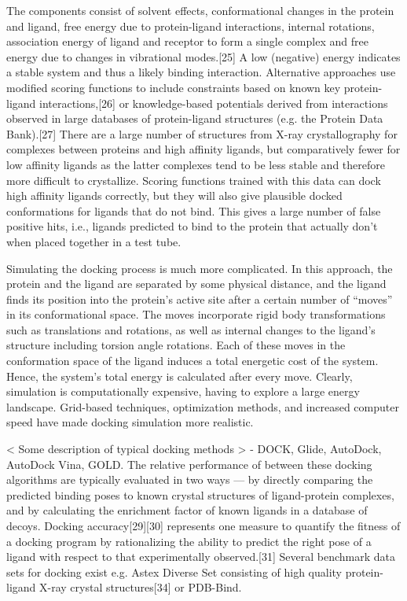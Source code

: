 The components consist of solvent effects, conformational changes in the protein and ligand, free energy due to protein-ligand interactions, internal rotations, association energy of ligand and receptor to form a single complex and free energy due to changes in vibrational modes.[25] A low (negative) energy indicates a stable system and thus a likely binding interaction. Alternative approaches use modified scoring functions to include constraints based on known key protein-ligand interactions,[26] or knowledge-based potentials derived from interactions observed in large databases of protein-ligand structures (e.g. the Protein Data Bank).[27] There are a large number of structures from X-ray crystallography for complexes between proteins and high affinity ligands, but comparatively fewer for low affinity ligands as the latter complexes tend to be less stable and therefore more difficult to crystallize. Scoring functions trained with this data can dock high affinity ligands correctly, but they will also give plausible docked conformations for ligands that do not bind. This gives a large number of false positive hits, i.e., ligands predicted to bind to the protein that actually don't when placed together in a test tube.

Simulating the docking process is much more complicated. In this approach, the protein and the ligand are separated by some physical distance, and the ligand finds its position into the protein's active site after a certain number of “moves” in its conformational space. The moves incorporate rigid body transformations such as translations and rotations, as well as internal changes to the ligand's structure including torsion angle rotations. Each of these moves in the conformation space of the ligand induces a total energetic cost of the system. Hence, the system's total energy is calculated after every move. Clearly, simulation is computationally expensive, having to explore a large energy landscape. Grid-based techniques, optimization methods, and increased computer speed have made docking simulation more realistic.

< Some description of typical docking methods > - DOCK, Glide, AutoDock, AutoDock Vina, GOLD. The relative performance of between these docking algorithms are typically evaluated in two ways — by directly comparing the predicted binding poses to known crystal structures of ligand-protein complexes, and by calculating the enrichment factor of known ligands in a database of decoys. Docking accuracy[29][30] represents one measure to quantify the fitness of a docking program by rationalizing the ability to predict the right pose of a ligand with respect to that experimentally observed.[31] Several benchmark data sets for docking exist e.g. Astex Diverse Set consisting of high quality protein-ligand X-ray crystal structures[34] or PDB-Bind.


